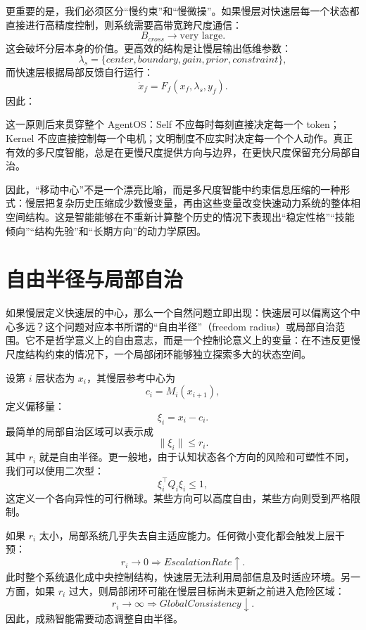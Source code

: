更重要的是，我们必须区分“慢约束”和“慢微操”。如果慢层对快速层每一个状态都直接进行高精度控制，则系统需要高带宽跨尺度通信：
\[
B_{cross}
\rightarrow
\text{very large}.
\]
这会破坏分层本身的价值。更高效的结构是让慢层输出低维参数：
\[
\lambda_s
=
\{
center,
boundary,
gain,
prior,
constraint
\},
\]
而快速层根据局部反馈自行运行：
\[
\dot{x}_f
=
F_f
\left(
x_f,
\lambda_s,
y_f
\right).
\]
因此：
\begin{statementbox}
\centering
{}
\end{statementbox}

这一原则后来贯穿整个 AgentOS：Self 不应每时每刻直接决定每一个 token；Kernel 不应直接控制每一个电机；文明制度不应实时决定每一个个人动作。真正有效的多尺度智能，总是在更慢尺度提供方向与边界，在更快尺度保留充分局部自治。

因此，“移动中心”不是一个漂亮比喻，而是多尺度智能中约束信息压缩的一种形式：慢层把复杂历史压缩成少数慢变量，再由这些变量改变快速动力系统的整体相空间结构。这是智能能够在不重新计算整个历史的情况下表现出“稳定性格”“技能倾向”“结构先验”和“长期方向”的动力学原因。

\section{自由半径与局部自治}

如果慢层定义快速层的中心，那么一个自然问题立即出现：快速层可以偏离这个中心多远？这个问题对应本书所谓的“自由半径”（freedom radius）或局部自治范围。它不是哲学意义上的自由意志，而是一个控制论意义上的变量：在不违反更慢尺度结构约束的情况下，一个局部闭环能够独立探索多大的状态空间。

设第 $i$ 层状态为 $x_i$，其慢层参考中心为
\[
c_i
=
M_i(x_{i+1}),
\]
定义偏移量：
\[
\xi_i
=
x_i-c_i.
\]
最简单的局部自治区域可以表示成
\[
\|\xi_i\|
\leq
r_i.
\]
其中 $r_i$ 就是自由半径。更一般地，由于认知状态各个方向的风险和可塑性不同，我们可以使用二次型：
\[
\xi_i^{\top}
Q_i
\xi_i
\leq
1,
\]
这定义一个各向异性的可行椭球。某些方向可以高度自由，某些方向则受到严格限制。

如果 $r_i$ 太小，局部系统几乎失去自主适应能力。任何微小变化都会触发上层干预：
\[
r_i\rightarrow0
\Rightarrow
EscalationRate\uparrow.
\]
此时整个系统退化成中央控制结构，快速层无法利用局部信息及时适应环境。另一方面，如果 $r_i$ 过大，则局部闭环可能在慢层目标尚未更新之前进入危险区域：
\[
r_i\rightarrow\infty
\Rightarrow
GlobalConsistency\downarrow.
\]
因此，成熟智能需要动态调整自由半径。

